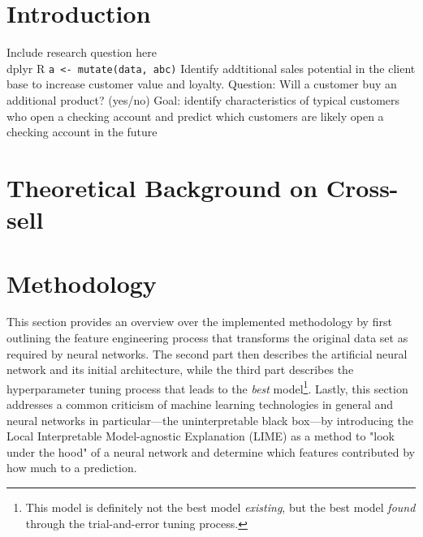 \documentclass[12pt,a4paper]{article}
\newcommand{\pkg}[1]{{\normalfont\fontseries{b}\selectfont #1}}
\let\proglang=\textsf
\let\code=\texttt
\begin{document}
\section{Introduction}
\citep{hastieElementsStatisticalLearning2017}
Include research question here \\
\pkg{dplyr}
\proglang{R}
\code{a <- mutate(data, abc)}
Identify  addtitional  sales  potential in the client base to increase customer value and loyalty. \newline
Question: Will a customer buy an additional product? (yes/no) \newline
Goal: identify characteristics of typical customers who open a checking account and predict which customers
are likely open a checking account in the future
\section{Theoretical Background on Cross-sell}

\section{Methodology}
This section provides an overview over the implemented methodology by first outlining the feature engineering process that transforms the original data set
as required by neural networks.
The second part then describes the artificial neural network and its initial architecture, while the third part describes the hyperparameter tuning process
that leads to the \textit{best} model\footnote{This model is definitely not the best model \textit{existing}, but the best model \textit{found} through the trial-and-error tuning process.}.
Lastly, this section addresses a common criticism of machine learning technologies in general and neural networks in particular---the 
uninterpretable black box---by introducing the Local Interpretable Model-agnostic Explanation (LIME) as a method to 
"look under the hood" of a neural network and determine which features contributed by how much to a prediction.
\end{document}
